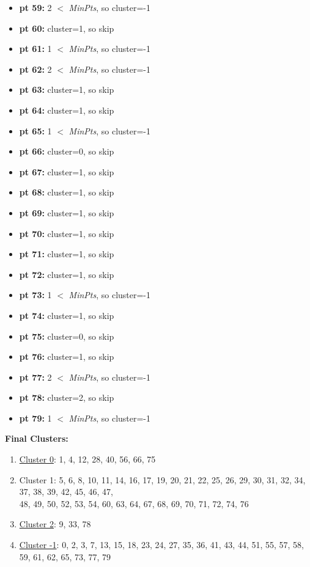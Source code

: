 \documentclass[11pt]{article}
\begin{document}
\begin{itemize}[label=$\star$]
			\item \textbf{pt 59:} 2 $<$ \textit{MinPts}, so cluster=-1
			\item \textbf{pt 60:} cluster=1, so skip
			\item \textbf{pt 61:} 1 $<$ \textit{MinPts}, so cluster=-1
			\item \textbf{pt 62:} 2 $<$ \textit{MinPts}, so cluster=-1
			\item \textbf{pt 63:} cluster=1, so skip
			\item \textbf{pt 64:} cluster=1, so skip
			\item \textbf{pt 65:} 1 $<$ \textit{MinPts}, so cluster=-1
			\item \textbf{pt 66:} cluster=0, so skip
			\item \textbf{pt 67:} cluster=1, so skip
			\item \textbf{pt 68:} cluster=1, so skip
			\item \textbf{pt 69:} cluster=1, so skip
			\item \textbf{pt 70:} cluster=1, so skip
			\item \textbf{pt 71:} cluster=1, so skip
			\item \textbf{pt 72:} cluster=1, so skip
			\item \textbf{pt 73:} 1 $<$ \textit{MinPts}, so cluster=-1
			\item \textbf{pt 74:} cluster=1, so skip
			\item \textbf{pt 75:} cluster=0, so skip
			\item \textbf{pt 76:} cluster=1, so skip
			\item \textbf{pt 77:} 2 $<$ \textit{MinPts}, so cluster=-1
			\item \textbf{pt 78:} cluster=2, so skip
			\item \textbf{pt 79:} 1 $<$ \textit{MinPts}, so cluster=-1
		\end{itemize}
	
\vspace{5mm}	
\textbf{Final Clusters:}
\begin{enumerate}
	\item \underline{Cluster 0}: {1, 4, 12, 28, 40, 56, 66, 75}
	\item Cluster 1: {5, 6, 8, 10, 11, 14, 16, 17, 19, 20, 21, 22, 25, 26, 29, 30, 31, 32, 34, 37, 38, 39, 42, 45, 46, 47,\\48, 49, 50, 52, 53, 54, 60, 63, 64, 67, 68, 69, 70, 71, 72, 74, 76}
	\item \underline{Cluster 2}: {9, 33, 78}
	\item \underline{Cluster -1}: {0, 2, 3, 7, 13, 15, 18, 23, 24, 27, 35, 36, 41, 43, 44, 51, 55, 57, 58, 59, 61, 62, 65, 73, 77, 79}
\end{enumerate}
\end{document}
